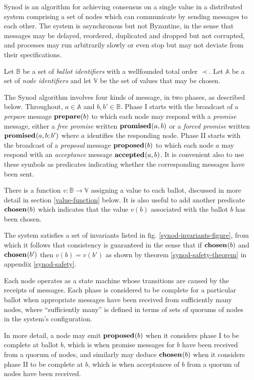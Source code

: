 \documentclass[journal]{IEEEtran}
\begin{document}
Synod\cite{part-time-parliament} is an algorithm for achieving consensus on a
single value in a distributed system comprising a set of nodes which can
communicate by sending messages to each other. The system is asynchronous but
not Byzantine, in the sense that messages may be delayed, reordered, duplicated
and dropped but not corrupted, and processes may run arbitrarily slowly or even
stop but may not deviate from their specifications.

Let $\mathbb B$ be a set of \textit{ballot identifiers} with a wellfounded
total order $\prec$. Let $\mathbb A$ be a set of \textit{node identifiers} and
let $\mathbb V$ be the set of values that may be chosen.

The Synod algorithm involves four kinds of message, in two phases, as described
below.  Throughout, $a \in \mathbb A$ and $b, b' \in \mathbb B$.  Phase I
starts with the broadcast of a \textit{prepare} message $\mathbf{prepare}(b)$ to which
each node may respond with a \textit{promise} message, either a \textit{free
promise} written $\mathbf{promised}_{}(a,b)$ or a \textit{forced promise} written
$\mathbf{promised}_{}(a,b;b')$ where $a$ identifies the responding node.  Phase II starts
with the broadcast of a \textit{proposal} message $\mathbf{proposed}_{}(b)$ to which each
node $a$ may respond with an \textit{acceptance} message $\mathbf{accepted}_{}(a,b)$. It is
convenient also to use these symbols as predicates indicating whether the
corresponding messages have been sent.

There is a function $v : \mathbb B \to \mathbb V$ assigning a value to each
ballot, discussed in more detail in section \ref{value-function} below.  It is
also useful to add another predicate $\mathbf{chosen}_{}(b)$ which indicates that the
value $v(b)$ associated with the ballot $b$ has been chosen.

The system satisfies a set of invariants listed in fig.
\ref{synod-invariants-figure}, from which it follows that consistency is
guaranteed in the sense that if $\mathbf{chosen}_{}(b)$ and $\mathbf{chosen}_{}(b')$ then $v(b) =
v(b')$ as shown by theorem \ref{synod-safety-theorem} in appendix
\ref{synod-safety}.

Each node operates as a state machine whose transitions are caused by the
receipts of messages. Each phase is considered to be complete for a particular
ballot when appropriate messages have been received from sufficiently many
nodes, where ``sufficiently many'' is defined in terms of sets of quorums of
nodes in the system's configuration.

In more detail, a node may emit $\mathbf{proposed}_{}(b)$ when it considers phase I to be
complete at ballot $b$, which is when promise messages for $b$ have been
received from a quorum of nodes, and similarly may deduce $\mathbf{chosen}_{}(b)$ when
it considers phase II to be complete at $b$, which is when acceptances of $b$
from a quorum of nodes have been received.
\end{document}
